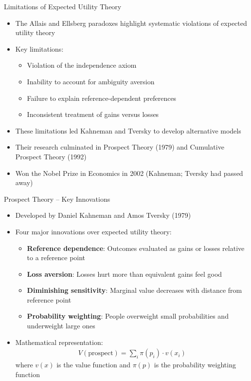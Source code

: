 \documentclass[10pt,handout]{beamer}
\begin{document}
\begin{frame}{Limitations of Expected Utility Theory}
  \begin{itemize}[<+->]
    \item The Allais and Ellsberg paradoxes highlight systematic violations of expected utility theory
    \item Key limitations:
      \begin{itemize}
        \item Violation of the independence axiom
        \item Inability to account for ambiguity aversion
        \item Failure to explain reference-dependent preferences
        \item Inconsistent treatment of gains versus losses
      \end{itemize}
    \item These limitations led Kahneman and Tversky to develop alternative models
    \item Their research culminated in Prospect Theory (1979) and Cumulative Prospect Theory (1992)
    \item Won the Nobel Prize in Economics in 2002 (Kahneman; Tversky had passed away)
  \end{itemize}
\end{frame}

\begin{frame}{Prospect Theory -- Key Innovations}
  \begin{itemize}[<+->]
    \item Developed by Daniel Kahneman and Amos Tversky (1979)
    \item Four major innovations over expected utility theory:
      \begin{itemize}
        \item \textbf{Reference dependence}: Outcomes evaluated as gains or losses relative to a reference point
        \item \textbf{Loss aversion}: Losses hurt more than equivalent gains feel good
        \item \textbf{Diminishing sensitivity}: Marginal value decreases with distance from reference point
        \item \textbf{Probability weighting}: People overweight small probabilities and underweight large ones
      \end{itemize}
    \item Mathematical representation: 
      \begin{align*}
        V(\text{prospect}) = \sum_{i} \pi(p_i) \cdot v(x_i)
      \end{align*}
      where $v(x)$ is the value function and $\pi(p)$ is the probability weighting function
  \end{itemize}
\end{frame}
\end{document}
